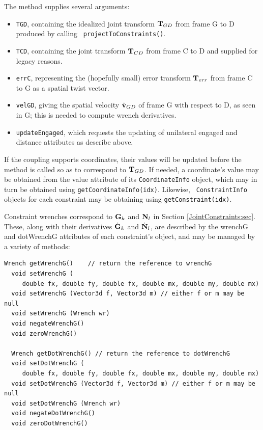 The method supplies several arguments: 

\begin{itemize}

\item {\tt TGD}, containing the idealized joint transform
${\bf T}_{GD}$ from frame G to D produced by calling {\tt
projectToConstraints()}.

\item {\tt TCD}, containing the joint transform ${\bf T}_{CD}$ from
frame C to D and supplied for legacy reasons.

\item {\tt errC}, representing the (hopefully small) error transform
${\bf T}_{err}$ from frame C to G as a spatial twist vector.

\item {\tt velGD}, giving the spatial velocity $\hat{{\bf v}}_{GD}$ of frame
G with respect to D, as seen in G; this is needed to compute wrench
derivatives.

\item {\tt updateEngaged}, which requests the updating of unilateral
{\sf engaged} and {\sf distance} attributes as describe above.

\end{itemize}

If the coupling supports coordinates, their values will be updated
before the method is called so as to correspond to ${\bf T}_{GD}$. If
needed, a coordinate's value may be obtained from the {\sf value}
attribute of its {\tt CoordinateInfo} object, which may in turn be
obtained using {\tt getCoordinateInfo(idx)}. Likewise, {\tt
ConstraintInfo} objects for each constraint may be obtaining using
{\tt getConstraint(idx)}.

Constraint wrenches correspond to ${\bf G}_k$ and ${\bf N}_l$ in Section
\ref{JointConstraints:sec}. These, along with their derivatives
$\dot{{\bf G}}_k$ and $\dot{{\bf N}}_l$, are described by the {\sf wrenchG} and {\sf
dotWrenchG} attributes of each constraint's
 object, and may
be managed by a variety of methods:
\begin{lstlisting}[]
  Wrench getWrenchG()    // return the reference to wrenchG
  void setWrenchG (
     double fx, double fy, double fx, double mx, double my, double mx)
  void setWrenchG (Vector3d f, Vector3d m) // either f or m may be null
  void setWrenchG (Wrench wr)
  void negateWrenchG()
  void zeroWrenchG()

  Wrench getDotWrenchG() // return the reference to dotWrenchG
  void setDotWrenchG (
     double fx, double fy, double fx, double mx, double my, double mx)
  void setDotWrenchG (Vector3d f, Vector3d m) // either f or m may be null
  void setDotWrenchG (Wrench wr)
  void negateDotWrenchG()
  void zeroDotWrenchG()
\end{lstlisting}
%

